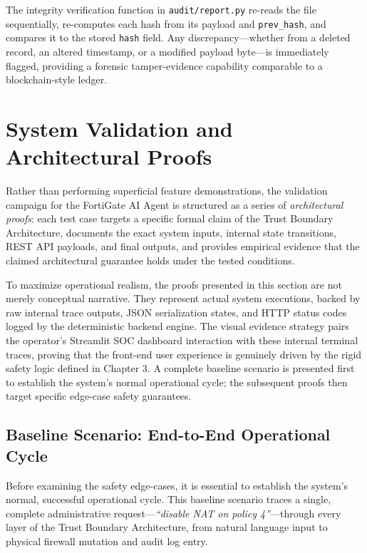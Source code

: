 The integrity verification function in \texttt{audit/report.py} re-reads the file sequentially, re-computes each hash from its payload and \texttt{prev\_hash}, and compares it to the stored \texttt{hash} field. Any discrepancy—whether from a deleted record, an altered timestamp, or a modified payload byte—is immediately flagged, providing a forensic tamper-evidence capability comparable to a blockchain-style ledger.

\section{System Validation and Architectural Proofs}
\label{sec:validation}

Rather than performing superficial feature demonstrations, the validation campaign for the FortiGate AI Agent is structured as a series of \emph{architectural proofs}: each test case targets a specific formal claim of the Trust Boundary Architecture, documents the exact system inputs, internal state transitions, REST API payloads, and final outputs, and provides empirical evidence that the claimed architectural guarantee holds under the tested conditions.

To maximize operational realism, the proofs presented in this section are not merely conceptual narrative. They represent actual system executions, backed by raw internal trace outputs, JSON serialization states, and HTTP status codes logged by the deterministic backend engine. The visual evidence strategy pairs the operator's Streamlit SOC dashboard interaction with these internal terminal traces, proving that the front-end user experience is genuinely driven by the rigid safety logic defined in Chapter 3. A complete baseline scenario is presented first to establish the system's normal operational cycle; the subsequent proofs then target specific edge-case safety guarantees.

\subsection{Baseline Scenario: End-to-End Operational Cycle}
\label{subsec:baseline}

Before examining the safety edge-cases, it is essential to establish the system's normal, successful operational cycle. This baseline scenario traces a single, complete administrative request—\emph{``disable NAT on policy 4''}—through every layer of the Trust Boundary Architecture, from natural language input to physical firewall mutation and audit log entry.

